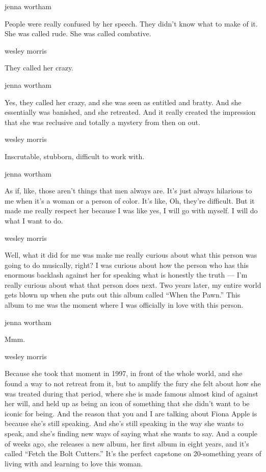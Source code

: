 jenna wortham

People were really confused by her speech. They didn't know what to make
of it. She was called rude. She was called combative.

wesley morris

They called her crazy.

jenna wortham

Yes, they called her crazy, and she was seen as entitled and bratty. And
she essentially was banished, and she retreated. And it really created
the impression that she was reclusive and totally a mystery from then on
out.

wesley morris

Inscrutable, stubborn, difficult to work with.

jenna wortham

As if, like, those aren't things that men always are. It's just always
hilarious to me when it's a woman or a person of color. It's like, Oh,
they're difficult. But it made me really respect her because I was like
yes, I will go with myself. I will do what I want to do.

wesley morris

Well, what it did for me was make me really curious about what this
person was going to do musically, right? I was curious about how the
person who has this enormous backlash against her for speaking what is
honestly the truth --- I'm really curious about what that person does
next. Two years later, my entire world gets blown up when she puts out
this album called ``When the Pawn.'' This album to me was the moment
where I was officially in love with this person.

jenna wortham

Mmm.

wesley morris

Because she took that moment in 1997, in front of the whole world, and
she found a way to not retreat from it, but to amplify the fury she felt
about how she was treated during that period, where she is made famous
almost kind of against her will, and held up as being an icon of
something that she didn't want to be iconic for being. And the reason
that you and I are talking about Fiona Apple is because she's still
speaking. And she's still speaking in the way she wants to speak, and
she's finding new ways of saying what she wants to say. And a couple of
weeks ago, she releases a new album, her first album in eight years, and
it's called ``Fetch the Bolt Cutters.'' It's the perfect capstone on
20-something years of living with and learning to love this woman.

